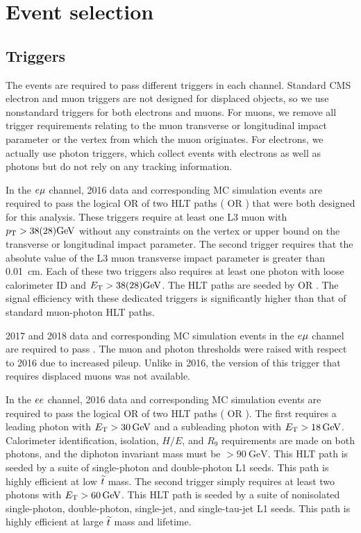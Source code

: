 \section{Event selection}
\label{selection}

\subsection{Triggers}
The events are required to pass different triggers in each channel. Standard CMS electron and muon triggers are not designed for displaced objects, so we use nonstandard triggers for both electrons and muons. For muons, we remove all trigger requirements relating to the muon transverse or longitudinal impact parameter or the vertex from which the muon originates. For electrons, we actually use photon triggers, which collect events with electrons as well as photons but do not rely on any tracking information.

In the $e{\mu}$ channel, 2016 data and corresponding MC simulation events are required to pass the logical OR of two HLT paths ( OR ) that were both designed for this analysis. These triggers require at least one L3 muon with $\pt>38(28)\si{\GeV}$ without any constraints on the vertex or upper bound on the transverse or longitudinal impact parameter. The second trigger requires that the absolute value of the L3 muon transverse impact parameter is greater than \SI{0.01}{\cm}. Each of these two triggers also requires at least one photon with loose calorimeter ID and $\ET>38(28)\si{\GeV}$. The HLT paths are seeded by  OR . The signal efficiency with these dedicated triggers is significantly higher than that of standard muon-photon HLT paths.

2017 and 2018 data and corresponding MC simulation events in the $e{\mu}$ channel are required to pass . The muon \pt and photon \ET thresholds were raised with respect to 2016 due to increased pileup. Unlike in 2016, the version of this trigger that requires displaced muons was not available.

In the $ee$ channel, 2016 data and corresponding MC simulation events are required to pass the logical OR of two HLT paths ( OR  ). The first requires a leading photon with $E_{\mathrm{T}}>30\,\text{Ge\hspace{-.08em}V}$ and a subleading photon with $\ET>\SI{18}{\GeV}$. Calorimeter identification, isolation, $H/E$, and $R_9$ requirements are made on both photons, and the diphoton invariant mass must be $>\SI{90}{\GeV}$. This HLT path is seeded by a suite of single-photon and double-photon L1 seeds. This path is highly efficient at low $\widetilde{t}$ mass. The second trigger simply requires at least two photons with $\ET>\SI{60}{\GeV}$. This HLT path is seeded by a suite of nonisolated single-photon, double-photon, single-jet, and single-tau-jet L1 seeds. This path is highly efficient at large $\widetilde{t}$ mass and lifetime.

